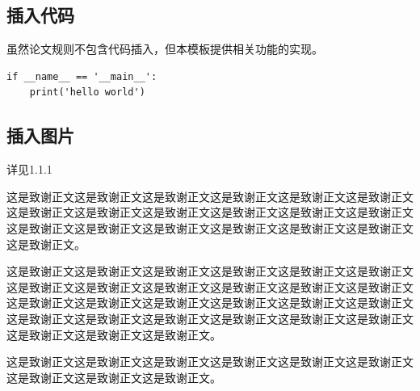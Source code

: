 \documentclass{bjfu}
\begin{document}
\subsection{插入代码}

虽然论文规则不包含代码插入，但本模板提供相关功能的实现。
\begin{verbatim}
if __name__ == '__main__':
    print('hello world')
\end{verbatim}

\subsection{插入图片}
详见1.1.1

\bjfuThanks
这是致谢正文这是致谢正文这是致谢正文这是致谢正文这是致谢正文这是致谢正文这是致谢正文这是致谢正文这是致谢正文这是致谢正文这是致谢正文这是致谢正文这是致谢正文这是致谢正文这是致谢正文这是致谢正文这是致谢正文这是致谢正文这是致谢正文。

这是致谢正文这是致谢正文这是致谢正文这是致谢正文这是致谢正文这是致谢正文这是致谢正文这是致谢正文这是致谢正文这是致谢正文这是致谢正文这是致谢正文这是致谢正文这是致谢正文这是致谢正文这是致谢正文这是致谢正文这是致谢正文这是致谢正文这是致谢正文这是致谢正文这是致谢正文这是致谢正文这是致谢正文这是致谢正文这是致谢正文这是致谢正文。

这是致谢正文这是致谢正文这是致谢正文这是致谢正文这是致谢正文这是致谢正文这是致谢正文这是致谢正文这是致谢正文。



\end{document}
